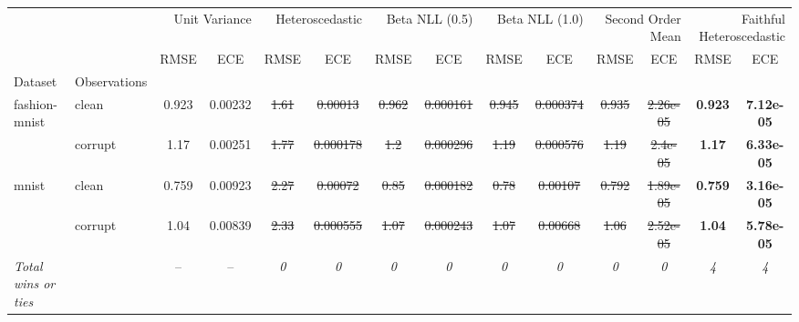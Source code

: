 \begin{tabular}{ll|cc|cc|cc|cc|cc|cc}
\toprule
{} & {} & \multicolumn{2}{r}{Unit Variance} & \multicolumn{2}{r}{Heteroscedastic} & \multicolumn{2}{r}{Beta NLL (0.5)} & \multicolumn{2}{r}{Beta NLL (1.0)} & \multicolumn{2}{r}{Second Order Mean} & \multicolumn{2}{r}{Faithful Heteroscedastic} \\
{} & {} & {RMSE} & {ECE} & {RMSE} & {ECE} & {RMSE} & {ECE} & {RMSE} & {ECE} & {RMSE} & {ECE} & {RMSE} & {ECE} \\
{Dataset} & {Observations} & {} & {} & {} & {} & {} & {} & {} & {} & {} & {} & {} & {} \\
\midrule
\multirow[t]{2}{*}{fashion-mnist} & clean & 0.923 & 0.00232 & \sout{1.61} & \sout{0.00013} & \sout{0.962} & \sout{0.000161} & \sout{0.945} & \sout{0.000374} & \sout{0.935} & \sout{2.26e-05} & \textbf{0.923} & \textbf{7.12e-05} \\
 & corrupt & 1.17 & 0.00251 & \sout{1.77} & \sout{0.000178} & \sout{1.2} & \sout{0.000296} & \sout{1.19} & \sout{0.000576} & \sout{1.19} & \sout{2.4e-05} & \textbf{1.17} & \textbf{6.33e-05} \\
\multirow[t]{2}{*}{mnist} & clean & 0.759 & 0.00923 & \sout{2.27} & \sout{0.00072} & \sout{0.85} & \sout{0.000182} & \sout{0.78} & \sout{0.00107} & \sout{0.792} & \sout{1.89e-05} & \textbf{0.759} & \textbf{3.16e-05} \\
 & corrupt & 1.04 & 0.00839 & \sout{2.33} & \sout{0.000555} & \sout{1.07} & \sout{0.000243} & \sout{1.07} & \sout{0.00668} & \sout{1.06} & \sout{2.52e-05} & \textbf{1.04} & \textbf{5.78e-05} \\
\textit{{Total wins or ties}} &  & -- & -- & \textit{0} & \textit{0} & \textit{0} & \textit{0} & \textit{0} & \textit{0} & \textit{0} & \textit{0} & \textit{4} & \textit{4} \\
\bottomrule
\end{tabular}

